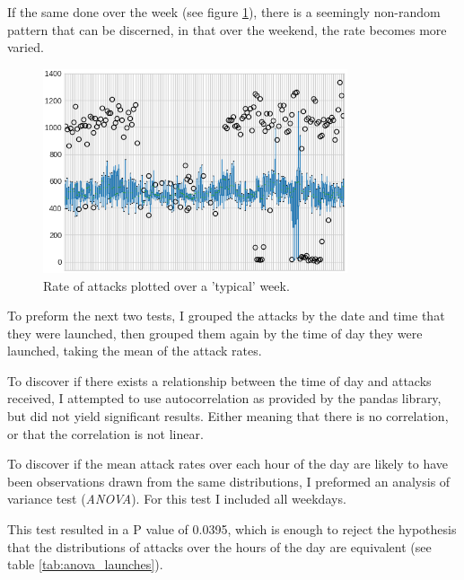     If the same done over the week (see figure \ref{fig:over_week}), 
    there is a seemingly
    non-random pattern that can be discerned, in that 
    over the weekend, the rate becomes more varied.


    \begin{figure}[H]
        \centering
        \includegraphics[width=0.8\textwidth]{src/images/week_unfiltered.png} 
        \caption{Rate of attacks plotted over a 'typical' week.}
        \label{fig:over_week}
    \end{figure}

    To preform the next two tests, I grouped the attacks by the
    date and time that they were launched, then grouped them 
    again by the time of day they were launched, taking the
    mean of the attack rates.

    To discover if there exists a relationship between the 
    time of day and attacks received, I attempted to use 
    autocorrelation as provided by the pandas library,
    but did not yield significant results. Either meaning that
    there is no correlation, or that the correlation is not 
    linear. 

    To discover if the mean attack rates over each hour of the
    day are likely to have been observations drawn from the same
    distributions, I preformed an 
    analysis of variance test (\textit{ANOVA}). 
    For this test I included all weekdays.

    This test resulted in a P value of 0.0395, which
    is enough to reject the hypothesis that the distributions
    of attacks over the hours of the day are equivalent (see table
    \ref{tab:anova_launches}).


